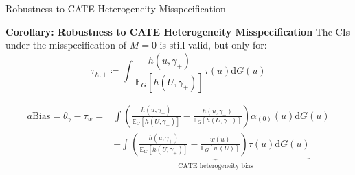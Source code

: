 \begin{frame}{Robustness to CATE Heterogeneity Misspecification}
    \begin{block}{\textbf{Corollary: Robustness to CATE Heterogeneity Misspecification}}
        The CIs under the misspecification of $M=0$ is still valid, but only for:
        $$
        \tau_{h,+}\coloneqq\int\frac{h\left(u,\gamma_{+}\right)}{\mathbb{E}_{G}\left[h\left(U,\gamma_{+}\right)\right]}\tau\left(u\right)\mathrm{d}G\left(u\right)
        $$
    \end{block}

    {\small
    \begin{align*}
        a\mathrm{Bias}=\theta_{\gamma}-\tau_{w}=&\int\left(\frac{h\left(u,\gamma_{+}\right)}{\mathbb{E}_{G}\left[h\left(U,\gamma_{+}\right)\right]}-\frac{h\left(u,\gamma_{-}\right)}{\mathbb{E}_{G}\left[h\left(U,\gamma_{-}\right)\right]}\right)\alpha_{\left(0\right)}\left(u\right)\mathrm{d}G\left(u\right)\\
        &+\underbrace{\int\left(\frac{h\left(u,\gamma_{+}\right)}{\mathbb{E}_{G}\left[h\left(U,\gamma_{+}\right)\right]}-\frac{w\left(u\right)}{\mathbb{E}_{G}\left[w\left(U\right)\right]}\right)\tau\left(u\right)\mathrm{d}G\left(u\right)}_{\text{CATE heterogeneity bias}}
    \end{align*}}
\end{frame}